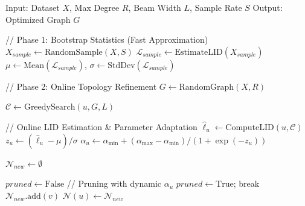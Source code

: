\documentclass{article}
\theoremstyle{plain}
\theoremstyle{definition}
\theoremstyle{remark}
\begin{document}
\begin{algorithm}[h!]
   \caption{Online Manifold-Consistent Graph Indexing}
   \label{alg:online_mcgi}
\begin{algorithmic}
   \STATE Input: Dataset $X$, Max Degree $R$, Beam Width $L$, Sample Rate $S$
   \STATE Output: Optimized Graph $G$

   \STATE
   \STATE // Phase 1: Bootstrap Statistics (Fast Approximation)
   \STATE $X_{sample} \leftarrow \text{RandomSample}(X, S)$
   \STATE $\mathcal{L}_{sample} \leftarrow \text{EstimateLID}(X_{sample})$ 
   \STATE $\mu \leftarrow \text{Mean}(\mathcal{L}_{sample})$, $\sigma \leftarrow \text{StdDev}(\mathcal{L}_{sample})$

   \STATE 
   \STATE // Phase 2: Online Topology Refinement
   \STATE $G \leftarrow \text{RandomGraph}(X, R)$
   
           \STATE $\mathcal{C} \leftarrow \text{GreedySearch}(u, G, L)$
           
           \STATE // Online LID Estimation \& Parameter Adaptation
           \STATE $\hat{\ell}_u \leftarrow \text{ComputeLID}(u, \mathcal{C})$ 
           \STATE $z_u \leftarrow (\hat{\ell}_u - \mu) / \sigma$
           \STATE $\alpha_u \leftarrow \alpha_{\min} + (\alpha_{\max} - \alpha_{\min}) / (1 + \exp(-z_u))$

           \STATE $\mathcal{N}_{new} \leftarrow \emptyset$
           
               \STATE $pruned \leftarrow \text{False}$
                   \STATE // Pruning with dynamic $\alpha_u$
                       \STATE $pruned \leftarrow \text{True}$; break
                   \ENDIF
               \ENDFOR
                   \STATE $\mathcal{N}_{new}.\text{add}(v)$
               \ENDIF
           \ENDFOR
           \STATE $\mathcal{N}(u) \leftarrow \mathcal{N}_{new}$
       \ENDFOR
   \ENDFOR
\end{algorithmic}
\end{algorithm}
\end{document}
